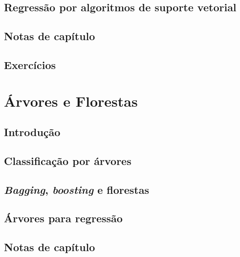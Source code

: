 \documentclass[
]{latex/krantz}
\theoremstyle{definition}
\theoremstyle{definition}
\theoremstyle{definition}
\theoremstyle{definition}
\theoremstyle{remark}
\begin{document}
\hypertarget{regressuxe3o-por-algoritmos-de-suporte-vetorial}{%
\section{Regressão por algoritmos de suporte vetorial}\label{regressuxe3o-por-algoritmos-de-suporte-vetorial}}

\hypertarget{notas-de-capuxedtulo-8}{%
\section{Notas de capítulo}\label{notas-de-capuxedtulo-8}}

\hypertarget{exercuxedcios-8}{%
\section{Exercícios}\label{exercuxedcios-8}}

\hypertarget{uxe1rvores-e-florestas}{%
\chapter{Árvores e Florestas}\label{uxe1rvores-e-florestas}}

\hypertarget{introduuxe7uxe3o-9}{%
\section{Introdução}\label{introduuxe7uxe3o-9}}

\hypertarget{classificauxe7uxe3o-por-uxe1rvores}{%
\section{Classificação por árvores}\label{classificauxe7uxe3o-por-uxe1rvores}}

\hypertarget{bagging-boosting-e-florestas}{%
\section{\texorpdfstring{\emph{Bagging}, \emph{boosting} e florestas}{Bagging, boosting e florestas}}\label{bagging-boosting-e-florestas}}

\hypertarget{uxe1rvores-para-regressuxe3o}{%
\section{Árvores para regressão}\label{uxe1rvores-para-regressuxe3o}}

\hypertarget{notas-de-capuxedtulo-9}{%
\section{Notas de capítulo}\label{notas-de-capuxedtulo-9}}
\end{document}
